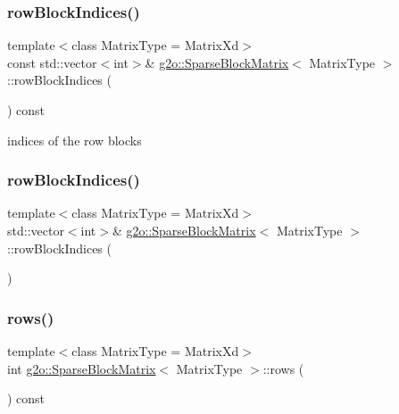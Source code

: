 \subsubsection{\texorpdfstring{row\+Block\+Indices()}{rowBlockIndices()}\hspace{0.1cm}{\footnotesize\ttfamily [1/2]}}
{\footnotesize\ttfamily template$<$class Matrix\+Type = Matrix\+Xd$>$ \\
const std\+::vector$<$int$>$\& \mbox{\hyperlink{classg2o_1_1_sparse_block_matrix}{g2o\+::\+Sparse\+Block\+Matrix}}$<$ Matrix\+Type $>$\+::row\+Block\+Indices (\begin{DoxyParamCaption}{ }\end{DoxyParamCaption}) const\hspace{0.3cm}{\ttfamily [inline]}}



indices of the row blocks 

\mbox{\label{classg2o_1_1_sparse_block_matrix_a03a2cfdb856c2dac4875889d55ecda84}} 
\subsubsection{\texorpdfstring{row\+Block\+Indices()}{rowBlockIndices()}\hspace{0.1cm}{\footnotesize\ttfamily [2/2]}}
{\footnotesize\ttfamily template$<$class Matrix\+Type = Matrix\+Xd$>$ \\
std\+::vector$<$int$>$\& \mbox{\hyperlink{classg2o_1_1_sparse_block_matrix}{g2o\+::\+Sparse\+Block\+Matrix}}$<$ Matrix\+Type $>$\+::row\+Block\+Indices (\begin{DoxyParamCaption}{ }\end{DoxyParamCaption})\hspace{0.3cm}{\ttfamily [inline]}}

\mbox{\label{classg2o_1_1_sparse_block_matrix_aaad7b1558369203795419345ee014852}} 
\subsubsection{\texorpdfstring{rows()}{rows()}}
{\footnotesize\ttfamily template$<$class Matrix\+Type = Matrix\+Xd$>$ \\
int \mbox{\hyperlink{classg2o_1_1_sparse_block_matrix}{g2o\+::\+Sparse\+Block\+Matrix}}$<$ Matrix\+Type $>$\+::rows (\begin{DoxyParamCaption}{ }\end{DoxyParamCaption}) const\hspace{0.3cm}{\ttfamily [inline]}}



